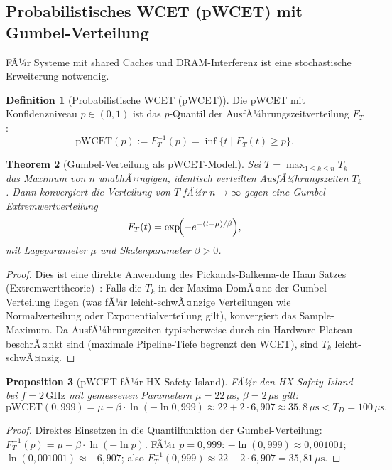 ﻿\documentclass[a4paper,12pt]{article}
\theoremstyle{plain}
\newtheorem{theorem}{Theorem}[section]
\newtheorem{proposition}[theorem]{Proposition}
\theoremstyle{definition}
\newtheorem{definition}[theorem]{Definition}
\theoremstyle{remark}
\begin{document}
\subsection{Probabilistisches WCET (pWCET) mit Gumbel-Verteilung}
\label{ssec:pwcet}

FÃ¼r Systeme mit shared Caches und DRAM-Interferenz ist eine
stochastische Erweiterung notwendig.

\begin{definition}[Probabilistische WCET (pWCET)]\label{def:pwcet}
Die pWCET mit Konfidenzniveau $p \in (0,1)$ ist das $p$-Quantil
der AusfÃ¼hrungszeitverteilung $F_T$:
\[
  \mathrm{pWCET}(p) := F_T^{-1}(p) = \inf\{t \mid F_T(t) \geq p\}.
\]
\end{definition}

\begin{theorem}[Gumbel-Verteilung als pWCET-Modell]\label{thm:gumbel}
Sei $T = \max_{1 \leq k \leq n} T_k$ das Maximum von $n$ unabhÃ¤ngigen,
identisch verteilten AusfÃ¼hrungszeiten $T_k$.
Dann konvergiert die Verteilung von $T$ fÃ¼r $n \to \infty$
gegen eine Gumbel-Extremwertverteilung
\[
  F_T(t) = \exp\!\Bigl(-e^{-(t-\mu)/\beta}\Bigr),
\]
mit Lageparameter $\mu$ und Skalenparameter $\beta > 0$.
\end{theorem}
\begin{proof}
Dies ist eine direkte Anwendung des Pickands-Balkema-de Haan Satzes
(Extremwerttheorie)~\cite{coles2001}: Falls die $T_k$ in der
Maxima-DomÃ¤ne der Gumbel-Verteilung liegen (was fÃ¼r
leicht-schwÃ¤nzige Verteilungen wie Normalverteilung oder
Exponentialverteilung gilt), konvergiert das Sample-Maximum.
Da AusfÃ¼hrungszeiten typischerweise durch ein Hardware-Plateau
beschrÃ¤nkt sind (maximale Pipeline-Tiefe begrenzt den WCET),
sind $T_k$ leicht-schwÃ¤nzig.
\end{proof}

\begin{proposition}[pWCET fÃ¼r HX-Safety-Island]\label{prop:pwcet_hx}
FÃ¼r den HX-Safety-Island bei $f=2\,\mathrm{GHz}$ mit gemessenen
Parametern $\mu = 22\,\mu\text{s}$, $\beta = 2\,\mu\text{s}$ gilt:
\[
  \mathrm{pWCET}(0{,}999) = \mu - \beta \cdot \ln(-\ln 0{,}999)
  \approx 22 + 2 \cdot 6{,}907 \approx 35{,}8\,\mu\text{s}
  < T_D = 100\,\mu\text{s}.
\]
\end{proposition}
\begin{proof}
Direktes Einsetzen in die Quantilfunktion der Gumbel-Verteilung:
$F_T^{-1}(p) = \mu - \beta \cdot \ln(-\ln p)$.
FÃ¼r $p=0{,}999$: $-\ln(0{,}999) \approx 0{,}001001$;
$\ln(0{,}001001) \approx -6{,}907$; also
$F_T^{-1}(0{,}999) \approx 22 + 2 \cdot 6{,}907 = 35{,}81\,\mu\text{s}$.
\end{proof}
\end{document}
